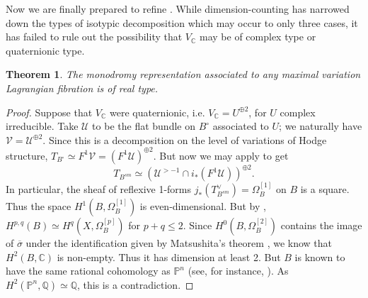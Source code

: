 \documentclass[12pt]{amsart}
\newcommand{\Q}{\mathbb{Q}}
\newcommand{\C}{\mathbb{C}}
\newtheorem{theorem}{Theorem}[section]
\theoremstyle{definition}
\theoremstyle{remark}
\numberwithin{equation}{section}
\begin{document}
Now we are finally prepared to refine . While 
dimension-counting has narrowed down the types of isotypic decomposition which 
may occur to only three cases, it has failed to rule out the possibility
that \(V_\C\) may be of complex type or quaternionic type.

\begin{theorem} \label{mv-real-type}
    The monodromy representation associated to any maximal variation Lagrangian
    fibration is of real type.
\end{theorem}
\begin{proof}
Suppose that $V_\C$ were quaternionic, i.e. $V_\C = U^{\oplus 2}$, for $U$ complex
irreducible. Take \(\mathcal{U}\) to be the flat bundle on \(B^\circ\) associated to
\(U\); we naturally have \(\mathcal{V} = \mathcal{U}^{\oplus 2}\). Since 
this is a decomposition on the level of variations of Hodge structure, 
\(T_{B^\circ} \simeq F^1 \mathcal{V} = \left(F^1 \mathcal{U}\right)^{\oplus 2}\).
But now we may apply  to get 
\begin{equation}
    T_{B^{sm}} \simeq 
    \left(\mathcal{U}^{>-1} \cap i_*(F^1 \mathcal{U})\right)^{\oplus 2}.
\end{equation}
In particular, the sheaf of reflexive 1-forms
\(j_* (T_{B^{sm}}^\vee) = \Omega_B^{[1]}\) on \(B\) is a square. Thus the space 
\(H^1(B, \Omega_B^{[1]})\) is even-dimensional. But by 
\cite[Corollary 2.3]{bak-lenh20}, \(H^{p,q}(B) \simeq H^q(X, \Omega_B^{[p]})\)
for \(p + q \leq 2\). 
Since \(H^0(B, \Omega_B^{[2]})\) contains the image of \(\overline{\sigma}\) under 
the identification given by Matsushita's theorem \cite{schnell23}, we know that 
\(H^2(B, \C)\) is non-empty. Thus it has dimension at least 2.
But \(B\) is known to have the same rational cohomology
as \(\mathbb{P}^n\) (see, for instance, \cite[Theorem 2.1]{huy22}). As 
\(H^2(\mathbb{P}^n, \Q) \simeq \Q\), this is a contradiction.



\end{proof}
\end{document}
